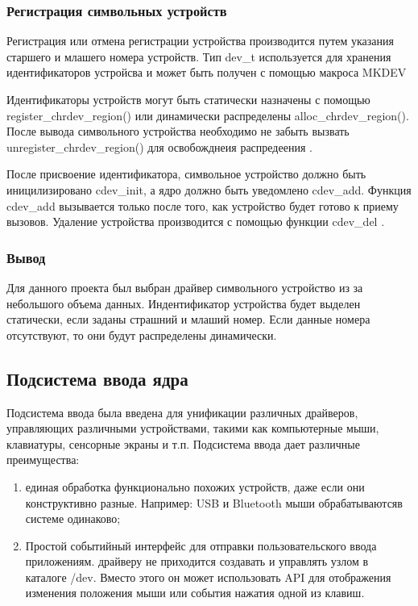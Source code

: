 \subsubsection{Регистрация символьных устройств}
Регистрация или отмена регистрации устройства производится путем указания старшего и млашего номера устройств.
Тип dev\_t используется для хранения идентификаторов устройсва и может быть получен с помощью макроса MKDEV

Идентификаторы устройств могут быть статически назначены с помощью register\_chrdev\_region() или динамически распределены alloc\_chrdev\_region().
После вывода символьного устройства необходимо не забыть вызвать unregister\_chrdev\_region() для освобожднеия распредеения \cite{7}.

После присвоение идентификатора, символьное устройство должно быть иницилизировано cdev\_init, а ядро должно быть уведомлено cdev\_add.
Функция cdev\_add вызывается только после того, как устройство будет готово к приему вызовов.
Удаление устройства производится с помощью функции cdev\_del \cite{7}.

\subsubsection{Вывод}
Для данного проекта был выбран драйвер символьного устройство из за небольшого объема данных.
Индентификатор устройства будет выделен статически, если заданы страшний и млаший номер.
Если данные номера отсутствуют, то они будут распределены динамически.

\subsection{Подсистема ввода ядра}
Подсистема ввода была введена для унификации различных драйверов, управляющих различными устройствами, такими как компьютерные мыши, клавиатуры, сенсорные экраны и т.п. Подсистема ввода дает различные преимущества:
\begin{enumerate}
	\item единая обработка функционально похожих устройств, даже если они конструктивно разные. 
	Например: USB и Bluetooth мыши обрабатываютсяв системе одинаково;
	\item Простой событийный интерфейс для отправки пользовательского ввода приложениям. 
	драйверу не приходится создавать и управлять узлом в каталоге /dev. 
	Вместо этого он может использовать API для отображения изменения положения мыши или события нажатия одной из клавиш. 
\end{enumerate}

